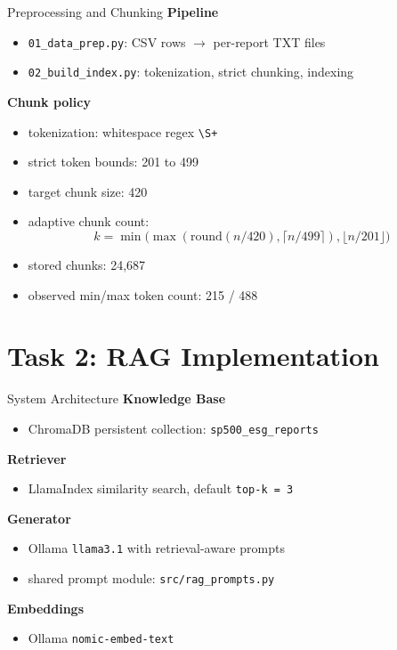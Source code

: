 \documentclass{beamer}
\begin{document}
\begin{frame}{Preprocessing and Chunking}
\small
\textbf{Pipeline}
\begin{itemize}
  \item \texttt{01\_data\_prep.py}: CSV rows \(\rightarrow\) per-report TXT files
  \item \texttt{02\_build\_index.py}: tokenization, strict chunking, indexing
\end{itemize}

\textbf{Chunk policy}
\begin{itemize}
  \item tokenization: whitespace regex \texttt{\textbackslash S+}
  \item strict token bounds: 201 to 499
  \item target chunk size: 420
  \item adaptive chunk count:
  \[
  k=\min\!\Big(\max(\text{round}(n/420),\lceil n/499\rceil),\lfloor n/201\rfloor\Big)
  \]
  \item stored chunks: 24,687
  \item observed min/max token count: 215 / 488
\end{itemize}
\end{frame}

\section{Task 2: RAG Implementation}

\begin{frame}{System Architecture}
\small
\textbf{Knowledge Base}
\begin{itemize}
  \item ChromaDB persistent collection: \texttt{sp500\_esg\_reports}
\end{itemize}

\textbf{Retriever}
\begin{itemize}
  \item LlamaIndex similarity search, default \texttt{top-k = 3}
\end{itemize}

\textbf{Generator}
\begin{itemize}
  \item Ollama \texttt{llama3.1} with retrieval-aware prompts
  \item shared prompt module: \texttt{src/rag\_prompts.py}
\end{itemize}

\textbf{Embeddings}
\begin{itemize}
  \item Ollama \texttt{nomic-embed-text}
\end{itemize}
\end{frame}
\end{document}

